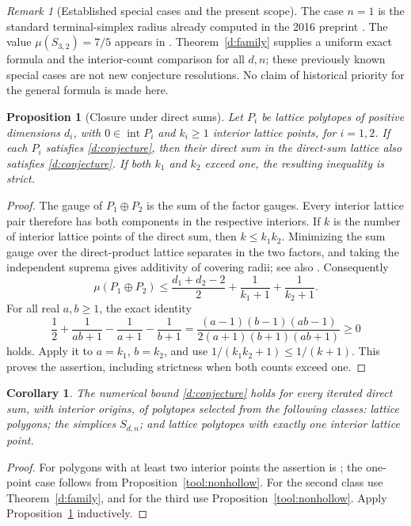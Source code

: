 \documentclass[11pt,a4paper]{article}
\newtheorem{proposition}[theorem]{Proposition}
\newtheorem{corollary}[theorem]{Corollary}
\theoremstyle{remark}\newtheorem{remark}[theorem]{Remark}
\DeclareMathOperator{\inter}{int}
\begin{document}
\begin{remark}[Established special cases and the present scope]
The case $n=1$ is the standard terminal-simplex radius already
computed in the 2016 preprint \cite[Proposition~4.8]{GMS}. The value
$\mu(S_{3,2})=7/5$ appears in \cite[Corollary~B.4]{CSS}.
Theorem~\ref{d:family} supplies a uniform exact formula and the
interior-count comparison for all $d,n$; these previously known
special cases are not new conjecture resolutions. No claim of
historical priority for the general formula is made here.
\end{remark}

\begin{proposition}[Closure under direct sums]\label{d:closure}
Let $P_i$ be lattice polytopes of positive dimensions $d_i$, with
$0\in\inter P_i$ and $k_i\ge1$ interior lattice points, for $i=1,2$.
If each $P_i$ satisfies \eqref{d:conjecture}, then their direct sum
in the direct-sum lattice also satisfies \eqref{d:conjecture}.
If both $k_1$ and $k_2$ exceed one, the resulting inequality is strict.
\end{proposition}
\begin{proof}
The gauge of $P_1\oplus P_2$ is the sum of the factor gauges.
Every interior lattice pair therefore has both components in the
respective interiors. If $k$ is the number of interior lattice
points of the direct sum, then $k\le k_1k_2$.
Minimizing the sum gauge over the direct-product lattice separates
in the two factors, and taking the independent suprema gives
additivity of covering radii; see also \cite[Corollary~2.2]{CSS}.
Consequently
\[
 \mu(P_1\oplus P_2)
 \le\frac{d_1+d_2-2}{2}+\frac1{k_1+1}+\frac1{k_2+1}.
\]
For all real $a,b\ge1$, the exact identity
\[
 \frac12+\frac1{ab+1}-\frac1{a+1}-\frac1{b+1}
 =\frac{(a-1)(b-1)(ab-1)}{2(a+1)(b+1)(ab+1)}\ge0
\]
holds. Apply it to $a=k_1$, $b=k_2$, and use
$1/(k_1k_2+1)\le1/(k+1)$. This proves the assertion, including
strictness when both counts exceed one.
\end{proof}

\begin{corollary}\label{d:generatedfamilies}
The numerical bound \eqref{d:conjecture} holds for every iterated
direct sum, with interior origins, of polytopes selected from the
following classes: lattice polygons; the simplices $S_{d,n}$;
and lattice polytopes with exactly one interior lattice point.
\end{corollary}
\begin{proof}
For polygons with at least two interior points the assertion is
\cite[Theorem~6.3]{CSS}; the one-point case follows from
Proposition~\ref{tool:nonhollow}. For the second class use
Theorem~\ref{d:family}, and for the third use
Proposition~\ref{tool:nonhollow}. Apply
Proposition~\ref{d:closure} inductively.
\end{proof}
\end{document}
